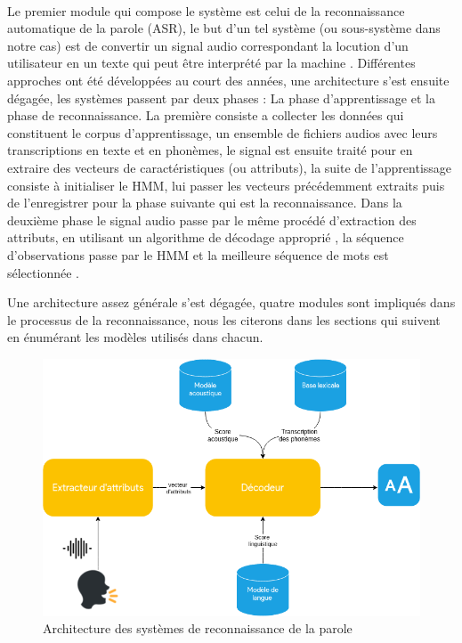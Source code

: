 	\paragraph{}
	Le premier module qui compose le système est celui de la reconnaissance automatique de la parole (ASR), le but d'un tel système (ou sous-système dans notre cas) est de convertir un signal audio correspondant la locution d'un utilisateur en un texte qui peut être interprété par la machine \cite{asr_definition}. Différentes approches ont été développées au court des années, une architecture s'est ensuite dégagée, les systèmes passent par deux phases : La phase d'apprentissage et la phase de reconnaissance. La première consiste a collecter les données qui constituent le corpus d'apprentissage, un ensemble de fichiers audios avec leurs transcriptions en texte et en phonèmes, le signal est ensuite traité pour en extraire des vecteurs de caractéristiques (ou attributs), la suite de l'apprentissage consiste à initialiser le HMM, lui passer les vecteurs précédemment extraits puis de l'enregistrer pour la phase suivante qui est la reconnaissance. Dans la deuxième phase le signal audio passe par le même procédé d'extraction des attributs, en utilisant un algorithme de décodage approprié \cite{viterbi_hmm}, la séquence d'observations passe par le HMM et la meilleure séquence de mots est sélectionnée \cite{speech_reco_Yu2015}.
	\par Une architecture assez générale s'est dégagée, quatre modules sont impliqués dans le processus de la reconnaissance, nous les citerons dans les sections qui suivent en énumérant les modèles utilisés dans chacun.
	
	\begin{figure}[H]
		\centering
		\label{ASR_schema}
		\includegraphics[width=0.75\linewidth]{images/ASR/schema.png}
		\caption{Architecture des systèmes de reconnaissance de la parole \cite{speech_reco_Yu2015}}
	\end{figure}
	
